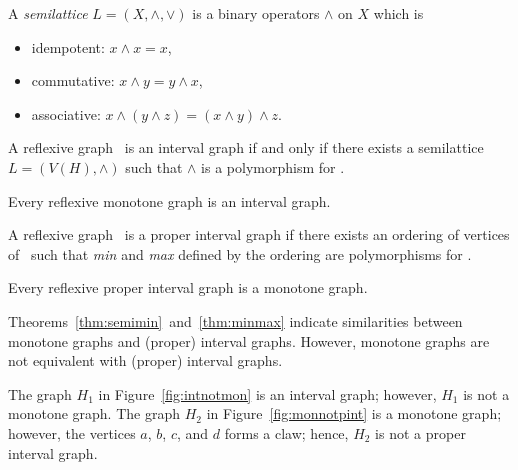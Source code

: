 \begin{defi} [Semilattice]
A \emph{semilattice} \(L=(X,\wedge,\vee)\) is a binary operators \(\wedge\) on \(X\) which is
\begin{itemize}
\item idempotent: \(x \wedge x = x\),
\item commutative: \(x \wedge y = y \wedge x\),
\item associative: \(x \wedge (y \wedge z) = (x \wedge y) \wedge z\).
\end{itemize}
\end{defi}

\begin{theorem}[TODO] \label{thm:semimin}
A reflexive graph \mH\ is an interval graph if and only if there exists
a semilattice \(L=(V(H), \wedge)\) such that \(\wedge\) is a polymorphism for \mH\@.
\end{theorem}

\begin{cor} \label{cor:intmon}
Every reflexive monotone graph is an interval graph.
\end{cor}

\begin{theorem} [TODO] \label{thm:minmax}
A reflexive graph \mH\ is a proper interval graph if there exists an ordering of 
vertices of \mH\ such that \emph{min} and \emph{max} defined by the ordering are
polymorphisms for \mH\@.
\end{theorem}

\begin{cor} \label{cor:pintmon}
Every reflexive proper interval graph is a monotone graph.
\end{cor}

Theorems~\ref{thm:semimin}~and~\ref{thm:minmax} indicate similarities between
monotone graphs and (proper) interval graphs. However, monotone graphs are not
equivalent with (proper) interval graphs.

\begin{example} \label{exm:diff}
The graph \(H_1\) in Figure~\ref{fig:intnotmon} is 
an interval graph; however, \(H_1\) is not a monotone graph.
The graph \(H_2\) in Figure~\ref{fig:monnotpint} is a monotone graph;
however, the vertices \(a\), \(b\), \(c\), and \(d\) forms a claw; hence,
\(H_2\) is not a proper interval graph. 

\begin{figure}[h]
\hfill
\subfigure[\ensuremath{H_1}]{\label{fig:intnotmon}}\hfill 
\subfigure[\ensuremath{H_2}]{\label{fig:monnotpint}}\hfill 
\end{figure}
\end{example}


